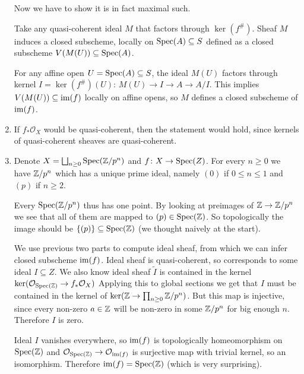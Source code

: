 \begin{exercise}{4}
\begin{enumerate}
{            Now we have to show it is in fact maximal such.

            Take any quasi-coherent ideal $M$ that factors through $\ker(f^\#)$.
            Sheaf $M$ induces a closed subscheme, locally on $\operatorname{Spec}(A) \subseteq
            S$ defined as a closed subscheme $V(M(U)) \subseteq \operatorname{Spec}(A)$.

            For any affine open $U = \operatorname{Spec}(A) \subseteq S$, the ideal $M(U)$
            factors through kernel $I = \ker(f^\#)(U)$: $M(U) \to I \to A \to
            A/I$. This implies $V(M(U)) \subseteq \operatorname{im}(f)$ locally on affine
            opens, so $M$ defines a closed subscheme of $\operatorname{im}(f)$.
            }
        \item{
            If $f_* \mathcal{O}_X$ would be quasi-coherent, then the statement
            would hold, since kernels of quasi-coherent sheaves are
            quasi-coherent.

            }
        \item{
            Denote $X = \bigsqcup_{n \geq 0} \operatorname{Spec}(\mathbb{Z} / p^n)$ and $f \colon X
            \to \operatorname{Spec}(Z)$.
            For every $n \geq 0$ we have $\mathbb{Z}/p^n$ which has a unique prime
            ideal, namely $(0)$ if $0 \leq n \leq 1$ and $(p)$ if $n \geq 2$.

            Every $\operatorname{Spec}(\mathbb{Z}/p^n)$ thus has one point.
            By looking at preimages of $\mathbb{Z} \to \mathbb{Z} / p^n$ we see that
            all of them are mapped to $(p) \in \operatorname{Spec}(\mathbb{Z})$.
            So topologically the image should be $\{(p)\} \subseteq \operatorname{Spec}(\mathbb{Z})$
            (we thought naively at the start).

            We use previous two parts to compute ideal sheaf, from which we can
            infer closed subscheme $\operatorname{im}(f)$.
            Ideal sheaf is quasi-coherent, so corresponds to some ideal $I
            \subseteq Z$.
            We also know ideal sheaf $\tilde{I}$ is contained in the kernel
            $\ker(\mathcal{O}_{\operatorname{Spec}(\mathbb{Z})} \to f_* \mathcal{O}_X)$
            Applying this to global sections we get that $I$ must be
            contained in the kernel of $\ker(\mathbb{Z} \to \prod_{n \geq 0} \mathbb{Z} / p^n)$.
            But this map is injective, since every non-zero $a \in \mathbb{Z}$ will be non-zero
            in some $\mathbb{Z} / p^n$ for big enough $n$. Therefore $I$ is zero.

            Ideal $I$ vanishes everywhere, so $\operatorname{im}(f)$ is topologically
            homeomorphism on $\operatorname{Spec}(\mathbb{Z})$ and $\mathcal{O}_{\operatorname{Spec}(\mathbb{Z})} \to
            \mathcal{O}_{\operatorname{im}(f)}$ is surjective map with trivial kernel, so an
            isomorphism. Therefore $\operatorname{im}(f) = \operatorname{Spec}(\mathbb{Z})$ (which is very
            surprising).
            }
    \end{enumerate}

\end{exercise}


